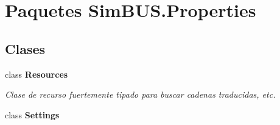 \section{Paquetes Sim\-B\-U\-S.\-Properties}
\label{namespace_sim_b_u_s_1_1_properties}
\subsection*{Clases}
\begin{DoxyCompactItemize}
\item 
class {\bf Resources}
\begin{DoxyCompactList}\small\item\em Clase de recurso fuertemente tipado para buscar cadenas traducidas, etc. \end{DoxyCompactList}\item 
class {\bf Settings}
\end{DoxyCompactItemize}

